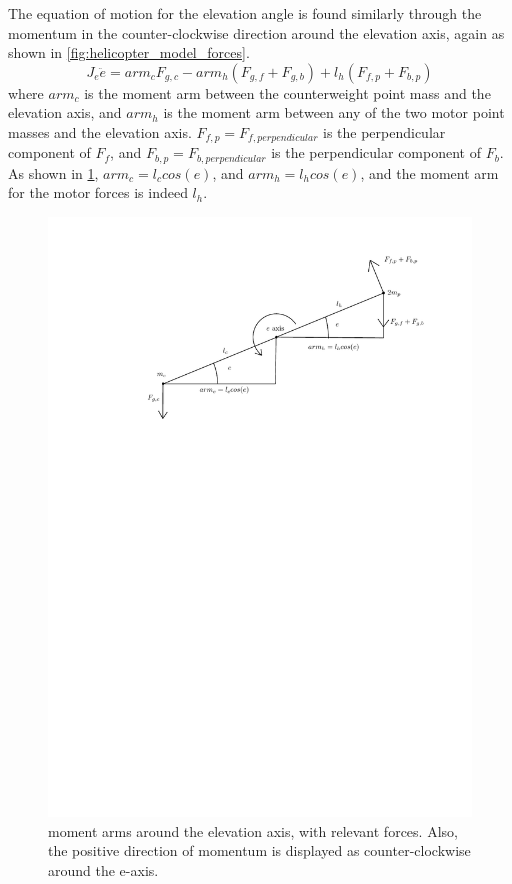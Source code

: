 The equation of motion for the elevation angle is found similarly
through the momentum in the counter-clockwise direction around the
elevation axis, again as shown in
\cref{fig:helicopter_model_forces}.
%
\begin{equation*}
  J_e\ddot{e} = arm_cF_{g,c} - arm_h(F_{g,f}+F_{g,b}) + l_h(F_{f,p} + F_{b,p})
\end{equation*}
%
where $arm_c$ is the moment arm between the counterweight point mass
and the elevation axis, and $arm_h$ is the moment arm between any of
the two motor point masses and the elevation axis. $F_{f,p} =
F_{f,perpendicular}$ is the perpendicular component of $F_f$, and
$F_{b,p} = F_{b,perpendicular}$ is the perpendicular component of
$F_b$. As shown in \cref{fig:elevation_model}, $arm_c = l_ccos(e)$,
and $arm_h = l_hcos(e)$, and the moment arm for the motor forces is indeed $l_h$.
%
\begin{figure}[H]
  \caption{moment arms around the elevation axis, with relevant
    forces. Also, the positive direction of momentum is displayed as
    counter-clockwise around the e-axis.}
  \label{fig:elevation_model}
  \includegraphics[width=1\textwidth]{images/elevation_model}
\end{figure}

